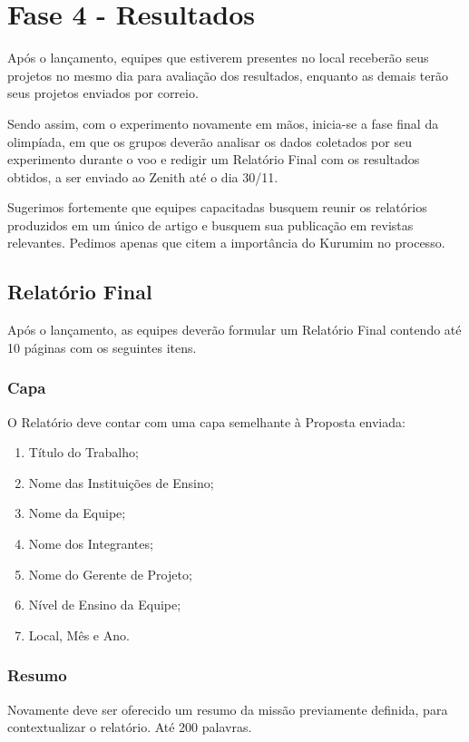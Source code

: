\section{Fase 4 - Resultados}
    Após o lançamento, equipes que estiverem presentes no local receberão seus projetos 
    no mesmo dia para avaliação dos resultados, enquanto as demais terão seus projetos 
    enviados por correio.

    Sendo assim, com o experimento novamente em mãos, inicia-se a fase final da olimpíada,
    em que os grupos deverão analisar os dados coletados por seu experimento durante o voo 
    e redigir um Relatório Final com os resultados obtidos, a ser enviado ao Zenith até o 
    dia 30/11.

    Sugerimos fortemente que equipes capacitadas busquem reunir os relatórios produzidos em
    um único de artigo e busquem sua publicação em revistas relevantes. Pedimos apenas que 
    citem a importância do Kurumim no processo.
    
    \subsection{Relatório Final}
        Após o lançamento, as equipes deverão formular um Relatório Final contendo até 
        10 páginas com os seguintes itens.

        \subsubsection{Capa}
            O Relatório deve contar com uma capa semelhante à Proposta enviada:
            \begin{enumerate}
                \item Título do Trabalho; 
                \item Nome das Instituições de Ensino; 
                \item Nome da Equipe; 
                \item Nome dos Integrantes; 
                \item Nome do Gerente de Projeto;
                \item Nível de Ensino da Equipe;
                \item Local, Mês e Ano. 
            \end{enumerate}
            
        \subsubsection{Resumo}
            Novamente deve ser oferecido um resumo da missão previamente definida, para contextualizar o relatório. Até 200 palavras.
        
